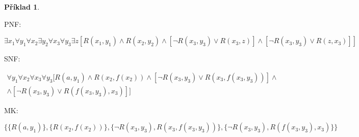 \documentclass[a4paper]{article}
\theoremstyle{definition}
\newtheorem{priklad}{Příklad}
\begin{document}
\begin{priklad}
\begin{enumerate}
        PNF:

        $ \exists x_1\forall y_1\forall x_2\exists y_2\forall x_3\forall y_3\exists z\left[R(x_1,y_1)\wedge R(x_2,y_2)\wedge \left[\neg R(x_3,y_3)\vee R(x_3,z)\right]\wedge\left[\neg R(x_3,y_3)\vee R(z,x_3)\right]\right] $

        SNF:

        {\setlength{\mathindent}{0cm}
        \setlength\abovedisplayskip{-1.5em}
        \begin{multline*}
        \forall y_1\forall x_2\forall x_3\forall y_3[R(a,y_1)\wedge R(x_2,f(x_2))\wedge \left[\neg R(x_3,y_3)\vee R(x_3,f(x_3,y_3))\right]\wedge \\\wedge[\neg R(x_3,y_3)\vee R(f(x_3,y_3),x_3)]]
        \end{multline*}
        }

        MK:

        $ \lbrace\lbrace R(a,y_1)\rbrace,\lbrace R(x_2,f(x_2))\rbrace, \lbrace\neg R(x_3,y_3), R(x_3,f(x_3,y_3))\rbrace,\lbrace\neg R(x_3,y_3), R(f(x_3,y_3),x_3)\rbrace\rbrace $
        
    \end{enumerate}
\end{priklad}
\end{document}
